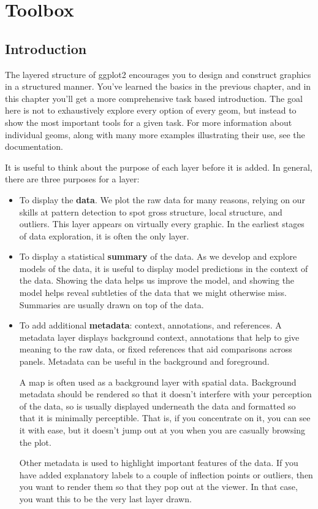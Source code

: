 \chapter{Toolbox}\label{cha:toolbox}

\section{Introduction}

The layered structure of ggplot2 encourages you to design and construct
graphics in a structured manner. You've learned the basics in the
previous chapter, and in this chapter you'll get a more comprehensive
task based introduction. The goal here is not to exhaustively explore
every option of every geom, but instead to show the most important tools
for a given task. For more information about individual geoms, along
with many more examples illustrating their use, see the documentation.

It is useful to think about the purpose of each layer before it is
added. In general, there are three purposes for a layer:

\begin{itemize}
\item
  To display the \textbf{data}. We plot the raw data for many reasons,
  relying on our skills at pattern detection to spot gross structure,
  local structure, and outliers. This layer appears on virtually every
  graphic. In the earliest stages of data exploration, it is often the
  only layer.
\item
  To display a statistical \textbf{summary} of the data. As we develop
  and explore models of the data, it is useful to display model
  predictions in the context of the data. Showing the data helps us
  improve the model, and showing the model helps reveal subtleties of
  the data that we might otherwise miss. Summaries are usually drawn on
  top of the data.
\item
  To add additional \textbf{metadata}: context, annotations, and
  references. A metadata layer displays background context, annotations
  that help to give meaning to the raw data, or fixed references that
  aid comparisons across panels. Metadata can be useful in the
  background and foreground.

  A map is often used as a background layer with spatial data.
  Background metadata should be rendered so that it doesn't interfere
  with your perception of the data, so is usually displayed underneath
  the data and formatted so that it is minimally perceptible. That is,
  if you concentrate on it, you can see it with ease, but it doesn't
  jump out at you when you are casually browsing the plot.

  Other metadata is used to highlight important features of the data. If
  you have added explanatory labels to a couple of inflection points or
  outliers, then you want to render them so that they pop out at the
  viewer. In that case, you want this to be the very last layer drawn.
\end{itemize}


